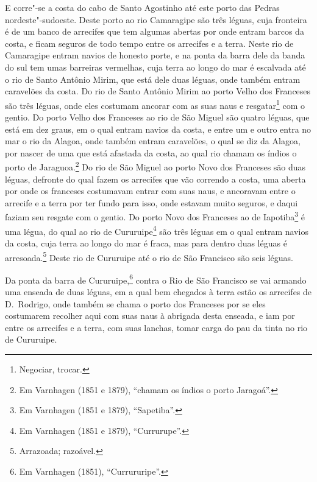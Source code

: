 E corre"-se a costa do cabo de Santo Agostinho até este porto das Pedras nordeste"-sudoeste.
Deste porto ao rio Camaragipe são três léguas, cuja fronteira é de um banco de arrecifes
que tem algumas abertas por onde entram barcos da costa, e ficam seguros de todo tempo
entre os arrecifes e a terra. Neste rio de Camaragipe entram navios de honesto porte, e na
ponta da barra dele da banda do sul tem umas barreiras vermelhas, cuja terra ao longo do
mar é escalvada até o rio de Santo Antônio Mirim, que está dele duas léguas, onde também
entram caravelões da costa. Do rio de Santo Antônio Mirim ao porto Velho dos Franceses são
três léguas, onde eles costumam ancorar com as suas naus e resgatar\footnote{ Negociar,
trocar.} com o gentio. Do porto Velho dos Franceses ao rio de São Miguel são quatro
léguas, que está em dez graus, em o qual entram navios da costa, e entre um e outro entra
no mar o rio da Alagoa, onde também entram caravelões, o qual se diz da Alagoa, por nascer
de uma que está afastada da costa, ao qual rio chamam os índios o porto de
Jaraguoa.\footnote{ Em Varnhagen (1851 e 1879), ``chamam os índios o porto Jaragoá''.} Do
rio de São Miguel ao porto Novo dos Franceses são duas léguas, defronte do qual fazem os
arrecifes que vão correndo a costa, uma aberta por onde os franceses costumavam entrar com
suas naus, e ancoravam entre o arrecife e a terra por ter fundo para isso, onde estavam
muito seguros, e daqui faziam seu resgate com o gentio. Do porto Novo dos Franceses ao de
Iapotiba\footnote{ Em Varnhagen (1851 e 1879), ``Sapetiba''.} é uma légua, do qual ao rio
de Cururuipe\footnote{ Em Varnhagen (1851 e 1879), ``Currurupe''.} são três léguas em o
qual entram navios da costa, cuja terra ao longo do mar é fraca, mas para dentro duas
léguas é arresoada.\footnote{ Arrazoada; razoável.} Deste rio de Cururuipe até o rio de
São Francisco são seis léguas.

Da ponta da barra de Cururuipe,\footnote{ Em Varnhagen (1851), ``Currururipe''.} contra o
Rio de São Francisco se vai armando uma enseada de duas léguas, em a qual bem chegados à
terra estão os arrecifes de D.~Rodrigo, onde também se chama o porto dos Franceses por se
eles costumarem recolher aqui com suas naus à abrigada desta enseada, e iam por entre os
arrecifes e a terra, com suas lanchas, tomar carga do pau da tinta no rio de Cururuipe.

